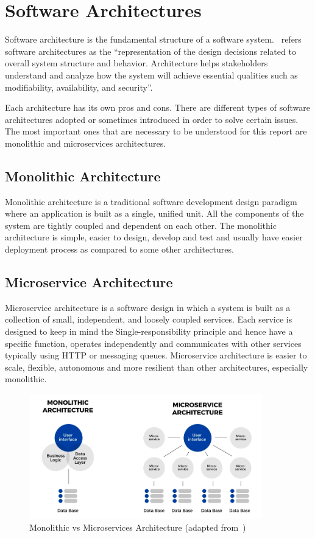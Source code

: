 \section{Software Architectures}
Software architecture is the fundamental structure of a software system.~\citep{sei_software_architecture} refers software architectures as the ``representation of the design decisions related to overall system structure and behavior. Architecture helps stakeholders understand and analyze how the system will achieve essential qualities such as modifiability, availability, and security''.

Each architecture has its own pros and cons. There are different types of software architectures adopted or sometimes introduced in order to solve certain issues. The most important ones that are necessary to be understood for this report are monolithic and microservices architectures.

\subsection{Monolithic Architecture}
Monolithic architecture is a traditional software development design paradigm where an application is built as a single, unified unit. All the components of the system are tightly coupled and dependent on each other. The monolithic architecture is simple, easier to design, develop and test and usually have easier deployment process as compared to some other architectures.

\subsection{Microservice Architecture}
Microservice architecture is a software design in which a system is built as a collection of small, independent, and loosely coupled services. Each service is designed to keep in mind the Single-responsibility principle and hence have a specific function, operates independently and communicates with other services typically using HTTP or messaging queues. Microservice architecture is easier to scale, flexible, autonomous and more resilient than other architectures, especially monolithic. 

\begin{figure}[H]
    \centering
    \includegraphics[width=0.9\textwidth]{figures/monolithic_microservices.png}
    \caption{Monolithic vs Microservices Architecture (adapted from~\cite{atlassian_microservices_vs_monolith})}
	\label{fig_background_monolithic_microservices}
\end{figure}


